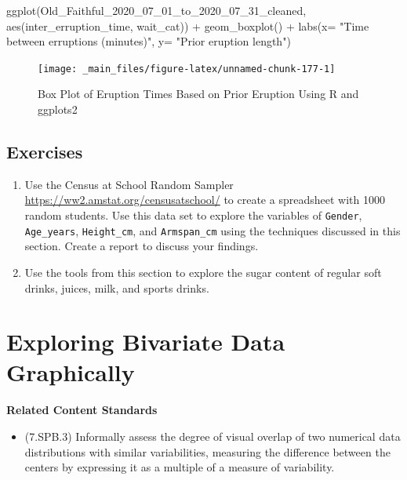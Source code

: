 \documentclass[
]{book}
\newenvironment{Shaded}{\begin{snugshade}}{\end{snugshade}}
\newcommand{\AttributeTok}[1]{\textcolor[rgb]{0.77,0.63,0.00}{#1}}
\newcommand{\FunctionTok}[1]{\textcolor[rgb]{0.00,0.00,0.00}{#1}}
\newcommand{\NormalTok}[1]{#1}
\newcommand{\SpecialCharTok}[1]{\textcolor[rgb]{0.00,0.00,0.00}{#1}}
\newcommand{\StringTok}[1]{\textcolor[rgb]{0.31,0.60,0.02}{#1}}
\providecommand{\tightlist}{%
  \setlength{\itemsep}{0pt}\setlength{\parskip}{0pt}}
\newenvironment{standards}{}{}
\let\stdsection\section
\renewcommand\section{\newpage\stdsection}
\theoremstyle{definition}
\theoremstyle{definition}
\theoremstyle{definition}
\theoremstyle{definition}
\theoremstyle{remark}
\begin{document}
\begin{Shaded}
\begin{Highlighting}[]
\FunctionTok{ggplot}\NormalTok{(Old\_Faithful\_2020\_07\_01\_to\_2020\_07\_31\_cleaned, }\FunctionTok{aes}\NormalTok{(inter\_erruption\_time, wait\_cat)) }\SpecialCharTok{+} \FunctionTok{geom\_boxplot}\NormalTok{() }\SpecialCharTok{+} \FunctionTok{labs}\NormalTok{(}\AttributeTok{x=} \StringTok{"Time between erruptions (minutes)"}\NormalTok{, }\AttributeTok{y=} \StringTok{"Prior eruption length"}\NormalTok{)}
\end{Highlighting}
\end{Shaded}

\begin{figure}

{\centering \texttt{[image: \_main\_files/figure-latex/unnamed-chunk-177-1]} 

}

\caption{Box Plot of Eruption Times Based on Prior Eruption Using R and ggplots2}\label{fig:unnamed-chunk-177}
\end{figure}

\hypertarget{exercises-60}{%
\subsection{Exercises}\label{exercises-60}}

\begin{enumerate}
\def\labelenumi{\arabic{enumi}.}
\item
  Use the Census at School Random Sampler \url{https://ww2.amstat.org/censusatschool/} to create a spreadsheet with 1000 random students. Use this data set to explore the variables of \texttt{Gender}, \texttt{Age\_years}, \texttt{Height\_cm}, and \texttt{Armspan\_cm} using the techniques discussed in this section. Create a report to discuss your findings.
\item
  Use the tools from this section to explore the sugar content of regular soft drinks, juices, milk, and sports drinks.
\end{enumerate}

\hypertarget{exploring-bivariate-data-graphically}{%
\section{Exploring Bivariate Data Graphically}\label{exploring-bivariate-data-graphically}}

\begin{standards}

\begin{center}
\textbf{Related Content Standards}

\end{center}

\begin{itemize}
\tightlist
\item
  (7.SPB.3) Informally assess the degree of visual overlap of two numerical data distributions with similar variabilities, measuring the difference between the centers by expressing it as a multiple of a measure of variability.
\end{itemize}

\end{standards}
\end{document}
